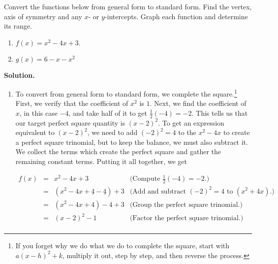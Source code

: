 \begin{ex}  \label{parabolaex2} Convert the functions below from general form to standard form.  Find the vertex, axis of symmetry and any $x$- or $y$-intercepts.  Graph each function and determine its range.

\enlargethispage{.25in}
\vspace{-.1in}
\begin{multicols}{2}
\begin{enumerate}

\item  $f(x) = x^2-4x+3$.
\item  $g(x) = 6-x-x^2$

\end{enumerate}
\end{multicols}
\vspace{-.2in}
\pagebreak

{\bf Solution.} 

\begin{enumerate}

\item   To convert from general form to standard form, we complete the square.\footnote{If you forget why we do what we do to complete the square, start with $a(x-h)^2 + k$, multiply it out, step by step, and then reverse the process.}  First, we verify that the coefficient of $x^2$ is $1$.  Next, we find the coefficient of $x$, in this case $-4$, and take half of it to get $\frac{1}{2}(-4) = -2$.  This tells us that our target perfect square quantity is $(x-2)^2$.  To get an expression equivalent to $(x-2)^2$, we need to add $(-2)^2 = 4$ to the $x^2-4x$ to create a perfect square trinomial, but to keep the balance, we must also subtract it.  We collect the terms which create the perfect square and gather the remaining constant terms. Putting it all together, we get 

\[ \begin{array}{rclr}

f(x) & = & x^2-4x+3 & \text{(Compute $\frac{1}{2} (-4) = -2$.)} \\ [2pt]
     & = & \left(x^2 - 4x + \underline{4}  - \underline{4}\right) + 3 & \text{(Add and subtract $(-2)^2 = 4$ to $(x^2+4x)$.)}\\ [2pt]
          & = & \left(x^2 - 4x + 4\right)  - 4 + 3 & \text{(Group the perfect square trinomial.)}\\ [2pt]
     & = & (x-2)^2 - 1 & \text{(Factor the perfect square trinomial.)} \\ \end{array} \]


\end{enumerate}
\end{ex}
